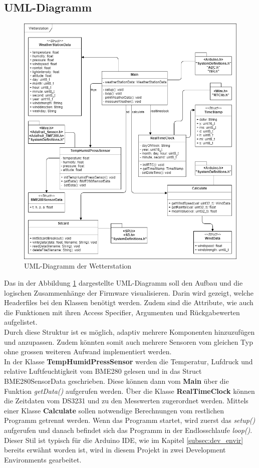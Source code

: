 \subsection{UML-Diagramm}

\begin{figure}[hbtp]
\centering
\includegraphics[width=\textwidth]{graphics/UML/UML_Diagramm_picture.PNG}
\caption{UML-Diagramm der Wetterstation}
\label{fig:uml_diagramm}
\end{figure}

Das in der Abbildung \ref{fig:uml_diagramm} dargestellte UML-Diagramm soll den Aufbau und die logischen Zusammenhänge der Firmware visualisieren. Darin wird gezeigt, welche Headerfiles bei den Klassen benötigt werden. Zudem sind die Attribute, wie auch die Funktionen mit ihren Access Specifier, Argumenten und Rückgabewerten aufgelistet. \\

Durch diese Struktur ist es möglich, adaptiv mehrere Komponenten hinzuzufügen und anzupassen. Zudem könnten somit auch mehrere Sensoren vom gleichen Typ ohne grossen weiteren Aufwand implementiert werden.\\

In der Klasse \textbf{TempHumidPressSensor} werden die Temperatur, Lufdruck und relative Luftfeuchtigkeit vom BME280 gelesen und in das Struct BME280SensorData geschrieben. Diese können dann vom \textbf{Main} über die Funktion \textit{getData()} aufgerufen werden. Über die Klasse \textbf{RealTimeClock} können die Zeitdaten vom DS3231 und zu den Messwerten zugerordnet werden. Mittels einer Klasse \textbf{Calculate} sollen notwendige Berechnungen vom restlichen Programm getrennt werden. Wenn das Programm startet, wird zuerst das \textit{setup()} aufgerufen und danach befindet sich das Programm in der Endlosschlaufe \textit{loop()}. Dieser Stil ist typisch für die Arduino IDE, wie im Kapitel \ref{subsec:dev_envir} bereits erwähnt worden ist, wird in diesem Projekt in zwei Development Environments gearbeitet.